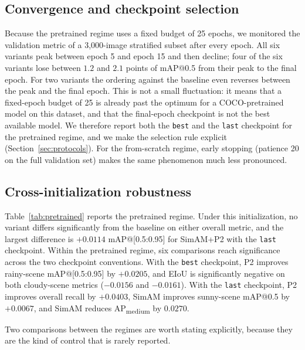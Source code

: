 \documentclass[pdflatex,sn-basic,Numbered]{sn-jnl}%
\begin{document}
\subsection{Convergence and checkpoint selection}\label{sec:convergence}

Because the pretrained regime uses a fixed budget of 25 epochs, we monitored the validation metric of a 3{,}000-image stratified subset after every epoch. All six variants peak between epoch 5 and epoch 15 and then decline; four of the six variants lose between $1.2$ and $2.1$ points of mAP@0.5 from their peak to the final epoch. For two variants the ordering against the baseline even reverses between the peak and the final epoch. This is not a small fluctuation: it means that a fixed-epoch budget of 25 is already past the optimum for a COCO-pretrained model on this dataset, and that the final-epoch checkpoint is not the best available model. We therefore report both the \texttt{best} and the \texttt{last} checkpoint for the pretrained regime, and we make the selection rule explicit (Section~\ref{sec:protocols}). For the from-scratch regime, early stopping (patience 20 on the full validation set) makes the same phenomenon much less pronounced.

\subsection{Cross-initialization robustness}\label{sec:pretrained}

Table~\ref{tab:pretrained} reports the pretrained regime. Under this initialization, no variant differs significantly from the baseline on either overall metric, and the largest difference is $+0.0114$ mAP@[0.5:0.95] for SimAM+P2 with the \texttt{last} checkpoint. Within the pretrained regime, six comparisons reach significance across the two checkpoint conventions. With the \texttt{best} checkpoint, P2 improves rainy-scene mAP@[0.5:0.95] by $+0.0205$, and EIoU is significantly negative on both cloudy-scene metrics ($-0.0156$ and $-0.0161$). With the \texttt{last} checkpoint, P2 improves overall recall by $+0.0403$, SimAM improves sunny-scene mAP@0.5 by $+0.0067$, and SimAM reduces AP\textsubscript{medium} by $0.0270$.

Two comparisons between the regimes are worth stating explicitly, because they are the kind of control that is rarely reported.
\end{document}
